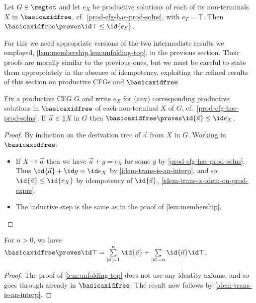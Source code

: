 \begin{proposition}
\label{reg-tot-prov-under-idem-trans}
    Let $G \in \regtot$ and let $e_X$ be productive solutions of each of its non-terminals $X$ in $\basicaxidfree$, cf.~\cref{prod-cfg-has-prod-solns}, with $e_T = \top$. 
    Then $\basicaxidfree \proves \id\top \leq \id{e_S}$. 
\end{proposition}

For this we need appropriate versions of the two intermediate results we employed, \cref{lem:membership,lem:unfolding-top}, in the previous section.
Their proofs are morally similar to the previous ones, but we must be careful to state them appropriately in the absence of idempotency, exploiting the refined results of this section on productive CFGs and $\basicaxidfree$
\begin{lemma}
\label{lem:membership-productive}
    Fix a productive CFG $G$ and write $e_X$ for (any) corresponding productive solutions in $\basicaxidfree$ of each non-terminal $X$ of $G$, cf.~\cref{prod-cfg-has-prod-solns}.
    If $\vec a \in \lang X$ in $G$ then $\basicaxidfree \proves \id{\vec a} \leq \id e_X$.
\end{lemma}
\begin{proof}
    By induction on the derivation tree of $\vec a $ from $X$ in $G$. Working in $\basicaxidfree$:
    \begin{itemize}
        \item If $X\to \vec a $ then we have $\vec a + g = e_X$ for some $g$ by \cref{prod-cfg-has-prod-solns}.
        Thus $\id{\vec a} + \id g = \id e_X$ by \cref{idem-trans-is-an-interp}, and so $\id{\vec a} \leq \id{e_X}$ by idempotency of $\id{\vec a}$, \cref{idem-trans-is-idem-on-prod-exprs}.
        \item The inductive step is the same as in the proof of \cref{lem:membership}. \qedhere
    \end{itemize}
\end{proof}


\begin{lemma}
\label{lem:unfolding-top-no-id}
    For $n>0$, we have $\basicaxidfree \proves \id\top = \sum\limits_{|\vec a|=1}^{n}\id{\vec a} + \sum\limits_{|\vec a|= n} \id{\vec a} \id\top$.
\end{lemma}
\begin{proof}
    The proof of \cref{lem:unfolding-top} does not use any identity axioms, and so goes through already in $\basicaxidfree$.
    The result now follows by \cref{idem-trans-is-an-interp}.
\end{proof}

